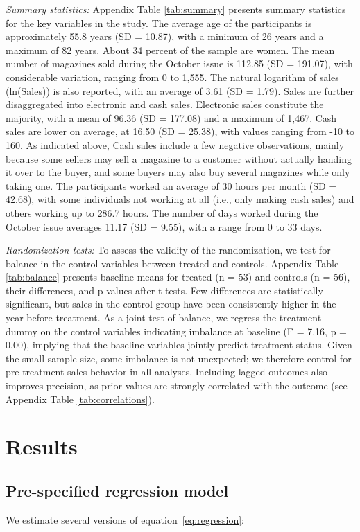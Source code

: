 \documentclass[12pt]{article}
\begin{document}
\textit{Summary statistics:} Appendix Table \ref{tab:summary} presents summary statistics for the key variables in the study. The average age of the participants is approximately 55.8 years (SD = 10.87), with a minimum of 26 years and a maximum of 82 years. About 34 percent of the sample are women. The mean number of magazines sold during the October issue is 112.85 (SD = 191.07), with considerable variation, ranging from 0 to 1,555. The natural logarithm of sales (ln(Sales)) is also reported, with an average of 3.61 (SD = 1.79). Sales are further disaggregated into electronic and cash sales. Electronic sales constitute the majority, with a mean of 96.36 (SD = 177.08) and a maximum of 1,467. Cash sales are lower on average, at 16.50 (SD = 25.38), with values ranging from -10 to 160. As indicated above, Cash sales include a few negative observations, mainly because some sellers may sell a magazine to a customer without actually handing it over to the buyer, and some buyers may also buy several magazines while only taking one. The participants worked an average of 30 hours per month (SD = 42.68), with some individuals not working at all (i.e., only making cash sales) and others working up to 286.7 hours. The number of days worked during the October issue averages 11.17 (SD = 9.55), with a range from 0 to 33 days.

\textit{Randomization tests:} To assess the validity of the randomization, we test for balance in the control variables between treated and controls. Appendix Table \ref{tab:balance} presents baseline means for treated (n = 53) and controls (n = 56), their differences, and p-values after t-tests. Few differences are statistically significant, but sales in the control group have been consistently higher in the year before treatment. As a joint test of balance, we regress the treatment dummy on the control variables indicating imbalance at baseline (F = 7.16, p = 0.00), implying that the baseline variables jointly predict treatment status. Given the small sample size, some imbalance is not unexpected; we therefore control for pre-treatment sales behavior in all analyses. Including lagged outcomes also improves precision, as prior values are strongly correlated with the outcome (see Appendix Table \ref{tab:correlations}).


\section{Results}
\subsection{Pre-specified regression model}
We estimate several versions of equation~\eqref{eq:regression}:
\end{document}
